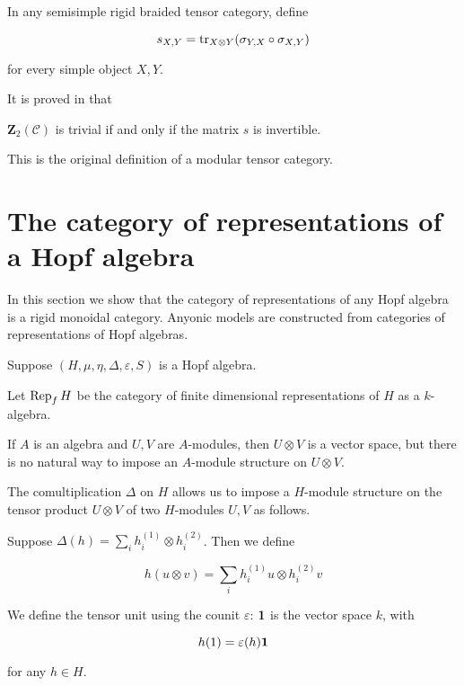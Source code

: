 In any semisimple rigid braided tensor category, define

\begin{equation}
    s_{X,Y} = \operatorname{tr}_{X \otimes Y}(\sigma_{Y,X} \circ \sigma_{X,Y})
\end{equation}

for every simple object $X,Y$.

It is proved in \cite{mueger2001} that
\begin{theorem}
    $\mathbf{Z}_2(\mathcal{C})$ is trivial if and only if the matrix $s$ is invertible. 
\end{theorem}

This is the original definition of a modular tensor category.

\section{The category of representations of a Hopf algebra}
\label{section:RepHopfAlgebra}

In this section we show that the category of representations of any Hopf
algebra is a rigid monoidal category. Anyonic models are constructed from
categories of representations of Hopf algebras.

Suppose $(H, \mu, \eta, \Delta, \varepsilon, S)$ is a Hopf algebra.

Let $\operatorname{Rep}_f H$ be the category of finite dimensional representations of $H$ as
a $k$-algebra.

If $A$ is an algebra and $U, V$ are $A$-modules, then $U \otimes V$ is a vector
space, but there is no natural way to impose an $A$-module structure on $U
\otimes V$. 

The comultiplication $\Delta$ on $H$ allows us to impose a $H$-module structure
on the tensor product $U \otimes V$ of two $H$-modules $U,V$ as follows.

Suppose $\Delta(h) = \sum _{i} h^{(1)}_i \otimes h^{(2)}_i$. Then we define

\begin{equation}
    h (u \otimes v) = \sum_{i} h^{(1)}_i u \otimes h^{(2)}_i v
\end{equation}

We define the tensor unit using the counit $\varepsilon$: $\mathbf{1}$ is the
vector space $k$, with 

\begin{equation}
    h(1) = \varepsilon(h) \mathbf{1} 
\end{equation}

 for any $h\in H$.

